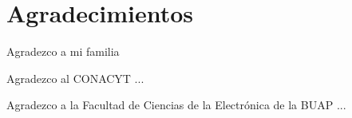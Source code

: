\chapter{Agradecimientos}

Agradezco a mi familia 

Agradezco al CONACYT ...

Agradezco a la Facultad de Ciencias de la Electrónica de la BUAP  ...